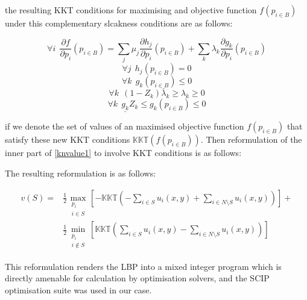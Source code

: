 the resulting KKT conditions for maximising and objective function $f(p_{i\in B})$ under this complementary slcakness conditions are as follows:

\begin{equation}\forall i~~\frac{\partial f}{\partial p_i}(p_{i\in B})=\sum_j\mu_j\frac{\partial h_j}{\partial p_i}(p_{i\in B}) + \sum_k\lambda_k\frac{\partial g_k}{\partial p_i}(p_{i\in B})\end{equation}
\begin{equation}\forall j~~ h_j(p_{i\in B})=0\end{equation}
\begin{equation}\forall k~~ g_k(p_{i\in B})\le 0\end{equation}
\begin{equation}\forall k~~ (1-Z_k)\bar{\lambda}_k \ge \lambda_k \ge 0\end{equation}
\begin{equation}\forall k~~ \underline{g_k}Z_k\le g_k(p_{i\in B}) \le 0\end{equation}

if we denote the set of values of an maximised objective function $f(p_{i\in B})$ that satisfy these new KKT conditions $\mathbb{KKT}(f(p_{i\in B}))$.
Then reformulation of the inner part of \eqref{knvalue1} to involve KKT conditions is as follows:

The resulting reformulation is as follows:

\begin{equation}
\label{optimization_eq1}
\begin{aligned}
v(S) =
&\frac{1}{2}\max_{\substack{p_i \\ i\in S}}   \left[-\mathbb{KKT}\left(-\sum_{i\in S} u_i(x,y) + \sum_{i\in N\setminus S}u_i(x,y)\right)\right] +\\
&\frac{1}{2}\min_{\substack{p_i \\ i\notin S}}\left[\mathbb{KKT}\left(\sum_{i\in S} u_i(x,y) - \sum_{i\in N\setminus S}u_i(x,y)\right)\right]
\end{aligned}
\end{equation}

This reformulation renders the LBP into a mixed integer program which is directly amenable for calculation by optimisation solvers, and the SCIP optimisation suite was used in our case.


